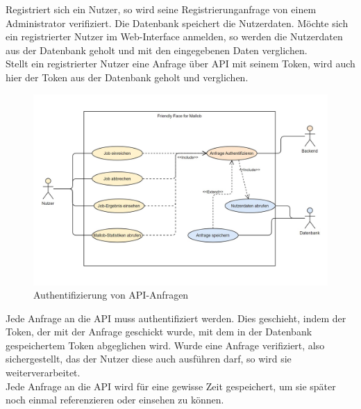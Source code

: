 Registriert sich ein Nutzer, so wird seine Registrierunganfrage von einem Administrator verifiziert. Die Datenbank speichert die Nutzerdaten.%
Möchte sich ein registrierter Nutzer im Web-Interface anmelden, so werden die Nutzerdaten aus der Datenbank geholt und mit den eingegebenen Daten verglichen. \\
Stellt ein registrierter Nutzer eine Anfrage über API mit seinem Token, wird auch hier der Token aus der Datenbank geholt und verglichen.
\begin{figure}[H]
    \centering
    \includegraphics[width=\textwidth]{images-interface/Request_authntification_screenshot.jpg}
    \caption{Authentifizierung von API-Anfragen}
\end{figure}
Jede Anfrage an die API muss authentifiziert werden. Dies geschieht, indem der Token, der mit der Anfrage geschickt wurde, mit dem in der Datenbank gespeichertem Token abgeglichen wird. Wurde eine Anfrage verifiziert, also sichergestellt, das der Nutzer diese auch ausführen darf, so wird sie weiterverarbeitet.\\
Jede Anfrage an die API wird für eine gewisse Zeit gespeichert, um sie später noch einmal referenzieren oder einsehen zu können.

\pagebreak

